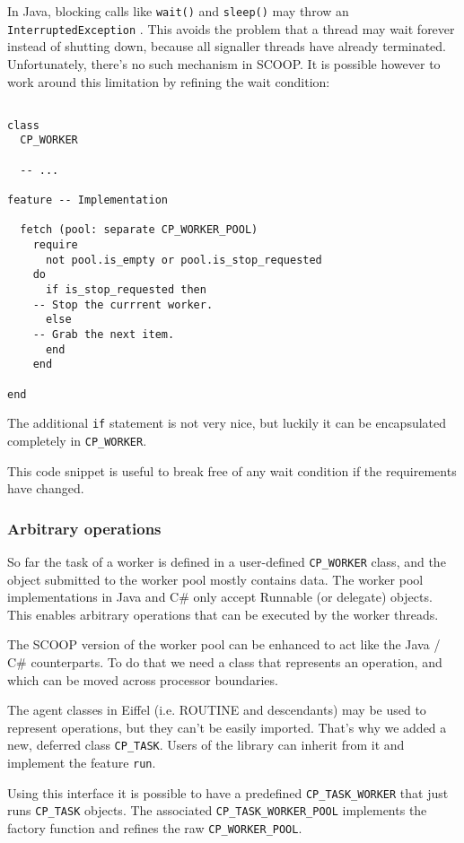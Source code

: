\documentclass[a4paper,10pt]{report}
\begin{document}
In Java, blocking calls like \lstinline!wait()! and \lstinline!sleep()! may throw an \lstinline!InterruptedException! .
This avoids the problem that a thread may wait forever instead of shutting down, because all signaller threads have already terminated.
Unfortunately, there's no such mechanism in SCOOP.
It is possible however to work around this limitation by refining the wait condition:
\begin{lstlisting}

class
  CP_WORKER
  
  -- ...
  
feature -- Implementation

  fetch (pool: separate CP_WORKER_POOL)
    require
      not pool.is_empty or pool.is_stop_requested
    do
      if is_stop_requested then
	-- Stop the currrent worker.
      else
	-- Grab the next item.
      end
    end

end
\end{lstlisting}
The additional \lstinline!if! statement is not very nice, but luckily it can be encapsulated completely in \lstinline!CP_WORKER!.

This code snippet is useful to break free of any wait condition if the requirements have changed.

\subsubsection{Arbitrary operations}
\label{sec:arbitrary-operations}

So far the task of a worker is defined in a user-defined \lstinline!CP_WORKER! class, and the object submitted to the worker pool mostly contains data.
The worker pool implementations in Java and C\# only accept Runnable (or delegate) objects.
This enables arbitrary operations that can be executed by the worker threads.

The SCOOP version of the worker pool can be enhanced to act like the Java / C\# counterparts.
To do that we need a class that represents an operation, and which can be moved across processor boundaries.

The agent classes in Eiffel (i.e. ROUTINE and descendants) may be used to represent operations, but they can't be easily imported.
That's why we added a new, deferred class \lstinline!CP_TASK!.
Users of the library can inherit from it and implement the feature \lstinline!run!.

Using this interface it is possible to have a predefined \lstinline!CP_TASK_WORKER! that just runs \lstinline!CP_TASK! objects.
The associated \lstinline!CP_TASK_WORKER_POOL! implements the factory function and refines the raw \lstinline!CP_WORKER_POOL!.
\end{document}
